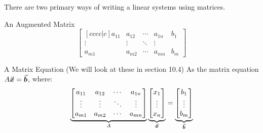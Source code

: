 \documentclass{beamer}
\begin{document}
\begin{frame}
\begin{block}{}
There are two primary ways of writing a linear systems using matrices.
\end{block}\pause
\begin{block}{An Augmented Matrix}
\begin{equation*}
\begin{bmatrix}[cccc|c]
a_{11}&a_{12}&\cdots&a_{1n}&b_1\\
\vdots&\vdots&\ddots&\vdots&\\
a_{m1}&a_{m2}&\cdots&a_{mn}&b_m
\end{bmatrix}
\end{equation*}
\end{block}\pause
\begin{block}{A Matrix Equation (We will look at these in section 10.4)}
As the matrix equation $A{\vec{\boldsymbol{x}}}={\vec{\boldsymbol{b}}}$, where:
\begin{equation*}
\underbrace{\begin{bmatrix}
a_{11}&a_{12}&\cdots&a_{1n}\\
\vdots&\vdots&\ddots&\vdots\\
a_{m1}&a_{m2}&\cdots&a_{mn}
\end{bmatrix}}_A
\underbrace{\begin{bmatrix}
x_1\\\vdots\\x_n
\end{bmatrix}}_{\vec{\boldsymbol{x}}}
=
\underbrace{\begin{bmatrix}
b_1\\\vdots\\b_m
\end{bmatrix}}_{\vec{\boldsymbol{b}}}
\end{equation*}
\end{block}
\end{frame}
\end{document}
